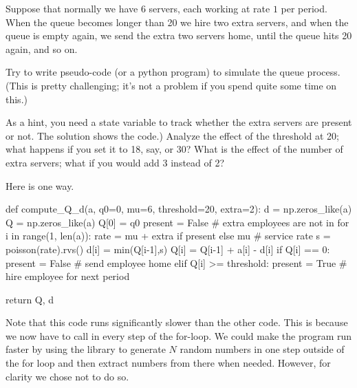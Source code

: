  Suppose that normally we have 6 servers, each working at rate $1$ per period. When the queue becomes longer than 20 we hire two extra servers, and when the queue is empty again, we send the extra two servers home, until the queue hits 20 again, and so on.
\begin{exercise}
  Try to write pseudo-code (or a  python program) to simulate the queue process. (This is pretty challenging; it's not a problem if you spend quite some time on this.)
  \begin{hint}
  As a hint, you need a state variable to track whether the extra servers are present or not. The solution shows the code.) Analyze the effect of the threshold at 20; what happens if you set it to 18, say, or 30? What is the effect of the number of extra servers; what if you would add 3 instead of 2?
  \end{hint}

  \begin{solution}
Here is one way.
    \begin{pyverbatim}
def compute_Q_d(a, q0=0, mu=6, threshold=20, extra=2):
    d = np.zeros_like(a)
    Q = np.zeros_like(a)
    Q[0] = q0
    present = False # extra employees are not in
    for i in range(1, len(a)):
        rate = mu + extra if present else mu # service rate
        s = poisson(rate).rvs()
        d[i] = min(Q[i-1],s)
        Q[i] = Q[i-1] + a[i] - d[i]
        if Q[i] == 0:
            present = False # send employee home
        elif Q[i] >= threshold:
            present = True # hire employee for next period
    
    return Q, d
    
    \end{pyverbatim}

    Note that this code runs significantly  slower than the other code. This is because  we now  have to call  in every step of the for-loop. We could make the program run faster by using the  library to generate $N$ random numbers in one step outside of the for loop and then extract numbers from there when needed. However, for clarity we chose not to do so.
  \end{solution}
  
\end{exercise}


